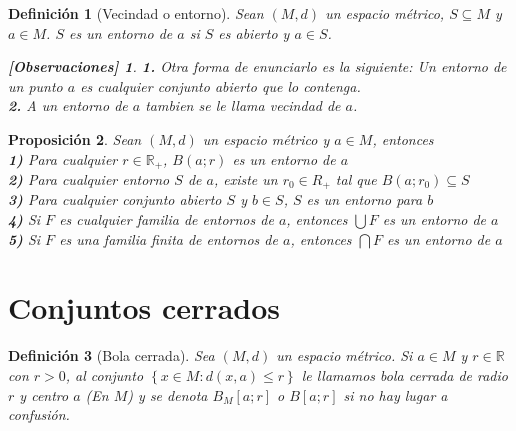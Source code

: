 \documentclass[oneside]{book} %
\theoremstyle{Teorema}
\newtheorem{Definicion}{Definición}[chapter]
\newtheorem{Proposicion}[Definicion]{Proposición}
\theoremstyle{Ejemplos}
\theoremstyle{[Obs]}
\newtheorem*{Obs}{[Observaciones]}
\renewcommand{\{}{\left\lbrace} %
\renewcommand{\}}{\right\rbrace} %
\newcommand{\U}{\bigcup} %
\newcommand{\N}{\bigcap} %
\renewcommand{\sc}{\subseteq} %
\newcommand{\R}{\mathbb{R}} %
\begin{document}
			\begin{Definicion}[Vecindad o entorno]
				
				Sean $(M, d)$ un espacio métrico, $S \sc M$ y $a \in M$. $S$ es un entorno de $a$ si $S$ es abierto y $a \in S$. \\

				\begin{Obs}
				
					\hfill
				
					\textbf{1.} Otra forma de enunciarlo es la siguiente: Un entorno de un punto $a$ es cualquier conjunto abierto que lo contenga. \\

					\textbf{2.} A un entorno de $a$ tambien se le llama vecindad de $a$. \\
				
				\end{Obs}

			\end{Definicion}

			\begin{Proposicion}
				
				Sean $(M, d)$ un espacio métrico y $a \in M$, entonces \\
				
				\textbf{1)} Para cualquier $r \in \R_{+}$, $B(a;r)$ es un entorno de $a$ \\ 

				\textbf{2)} Para cualquier entorno $S$ de $a$, existe un $r_0 \in R_{+}$ tal que $B(a;r_0) \sc S$ \\

				\textbf{3)} Para cualquier conjunto abierto $S$ y $b \in S$, $S$ es un entorno para $b$ \\

				\textbf{4)} Si $F$ es cualquier familia de entornos de $a$, entonces $\U F$ es un entorno de $a$ \\

				\textbf{5)} Si $F$ es una familia finita de entornos de $a$, entonces $\N F$ es un entorno de $a$ \\

			\end{Proposicion}

		\section{Conjuntos cerrados}

			\begin{Definicion}[Bola cerrada]
					
				Sea $(M, d)$ un espacio métrico. Si $a \in M$ y $r \in \R$ con $r > 0$, al conjunto $\{ x \in M : d(x, a) \leq r \}$ le llamamos bola cerrada de radio $r$ y centro $a$ (En $M$) y se denota $B_M[a;r]$ o $B[a;r]$ si no hay lugar a confusión. \\

			\end{Definicion}
\end{document}
